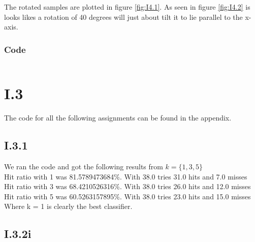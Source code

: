 \documentclass{article}
\begin{document}
The rotated samples are plotted in figure \ref{fig:I4.1}. As seen in
figure \ref{fig:I4.2} is looks likes a rotation of 40 degrees will just
about tilt it to lie parallel to the x-axis.



\subsubsection{Code}

\inputminted{matlab}{part1/i24john.m}


\section{I.3}

The code for all the following assignments can be found in the appendix.

\subsection{I.3.1}
We ran the code and got the following results from $k = \{1,3,5\}$\\
Hit ratio with 1 was {\color{green}81.5789473684\%}. With 38.0 tries 31.0 hits and 7.0 misses\\
Hit ratio with 3 was {\color{yellow}68.4210526316\%}. With 38.0 tries 26.0 hits and 12.0 misses\\
Hit ratio with 5 was {\color{yellow}60.5263157895\%}. With 38.0 tries 23.0 hits and 15.0 misses\\
Where k = 1 is clearly the best classifier.\\

\subsection{I.3.2i}
\end{document}
